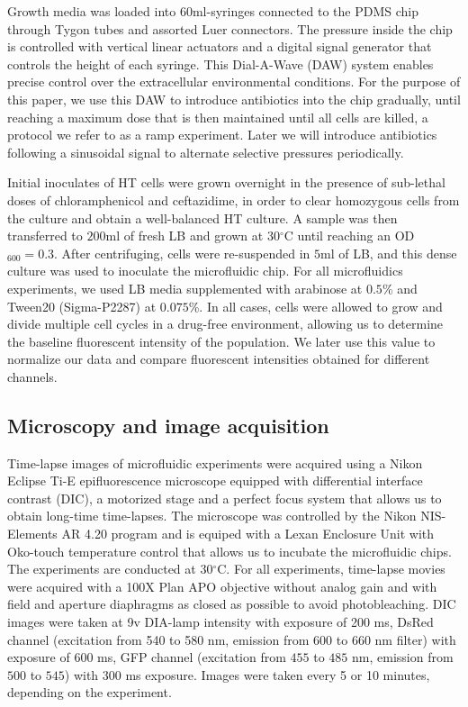 \documentclass[fleqn,12pt]{wlscirep}
\begin{document}
Growth media was loaded into $60$ml-syringes connected to the PDMS chip through Tygon tubes and assorted Luer connectors. The pressure inside the chip is controlled with vertical linear actuators and a digital signal generator that controls the height of each syringe. 
This Dial-A-Wave (DAW) system\cite{Ferry2011} enables precise control over the extracellular environmental conditions. For the purpose of this paper, we use this DAW to introduce antibiotics into the chip gradually, until reaching a maximum dose that is then maintained until all cells are killed, a protocol we refer to as a ramp experiment.  Later we will introduce antibiotics following a sinusoidal signal to alternate selective pressures periodically.

Initial inoculates of HT cells were grown overnight in the presence of sub-lethal doses of chloramphenicol and ceftazidime, in order to clear homozygous cells from the culture and obtain a well-balanced HT culture.
A sample was then transferred to $200$ml of fresh LB and grown at 30$^{\circ}$C until reaching an OD$_{600}=0.3$.  After centrifuging, cells were re-suspended in $5$ml of LB, and this dense culture was used to inoculate the microfluidic chip. For all microfluidics experiments, we used LB media supplemented with arabinose at $0.5$\% and Tween20 ({Sigma-P2287}) at $0.075$\%. In all cases, cells were allowed to grow and divide multiple cell cycles in a drug-free environment, allowing us to determine the baseline fluorescent intensity of the population. We later use this value to normalize our data and compare fluorescent intensities obtained for different channels.

\subsection{Microscopy and image acquisition}

Time-lapse images of microfluidic experiments were acquired using a Nikon Eclipse Ti-E epifluorescence microscope equipped with differential interface contrast (DIC), a motorized stage and a perfect focus system that allows us to obtain long-time time-lapses. The microscope was controlled by the Nikon NIS-Elements AR 4.20 program and is equiped with a Lexan Enclosure Unit with Oko-touch temperature control that allows us to incubate the microfluidic chips. The experiments are conducted at 30$^{\circ}$C.
For all experiments, time-lapse movies were acquired with a 100X Plan APO objective without analog gain and with field and aperture diaphragms as closed as possible to avoid photobleaching. DIC images were taken at 9v DIA-lamp intensity with exposure of 200 ms, DsRed channel (excitation from 540 to 580 nm, emission from $600$ to $660$ nm filter) with exposure of 600 ms, GFP channel (excitation from $455$ to $485$ nm, emission from $500$ to $545$) with $300$ ms exposure. Images were taken every 5 or 10 minutes, depending on the experiment. 
\end{document}
